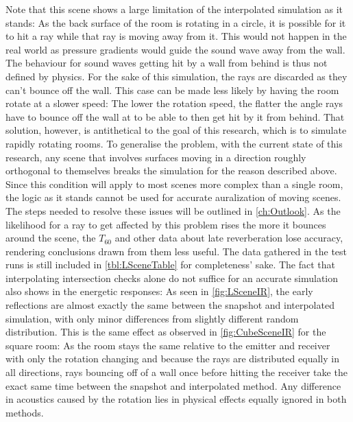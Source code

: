 Note that this scene shows a large limitation of the interpolated simulation as it stands:
As the back surface of the room is rotating in a circle,
it is possible for it to hit a ray while that ray is moving away from it.
This would not happen in the real world as pressure gradients would guide the sound wave away from the wall.
\newline
The behaviour for sound waves getting hit by a wall from behind is thus not defined by physics.
For the sake of this simulation, the rays are discarded as they can't bounce off the wall.
This case can be made less likely by having the room rotate at a slower speed:
The lower the rotation speed, the flatter the angle rays have to bounce off the wall at to be able to then get hit by it from behind.
That solution, however, is antithetical to the goal of this research, which is to simulate rapidly rotating rooms.
\newline
To generalise the problem, with the current state of this research,
any scene that involves surfaces moving in a direction roughly orthogonal to themselves breaks the simulation for the reason described above.
Since this condition will apply to most scenes more complex than a single room,
the logic as it stands cannot be used for accurate auralization of moving scenes.
The steps needed to resolve these issues will be outlined in \autoref{ch:Outlook}.
\newline
As the likelihood for a ray to get affected by this problem rises the more it bounces around the scene,
the \(T_{60}\) and other data about late reverberation lose accuracy,
rendering conclusions drawn from them less useful.
The data gathered in the test runs is still included in \autoref{tbl:LSceneTable} for completeness' sake.
\newline
The fact that interpolating intersection checks alone do not suffice for an accurate simulation also shows in the energetic responses:
As seen in \autoref{fig:LSceneIR}, the early reflections are almost exactly the same between the snapshot and interpolated simulation,
with only minor differences from slightly different random distribution.
This is the same effect as observed in \autoref{fig:CubeSceneIR} for the square room:
As the room stays the same relative to the emitter and receiver with only the rotation changing
and because the rays are distributed equally in all directions,
rays bouncing off of a wall once before hitting the receiver take the exact same time between the snapshot and interpolated method.
Any difference in acoustics caused by the rotation lies in physical effects equally ignored in both methods.

